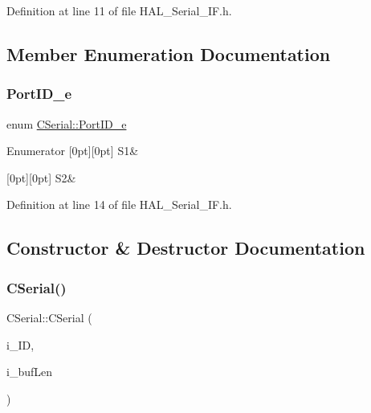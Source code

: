 Definition at line 11 of file H\+A\+L\+\_\+\+Serial\+\_\+\+I\+F.\+h.



\subsection{Member Enumeration Documentation}
\mbox{\label{class_c_serial_a000039540cc90b18bafacf5744e7eda2}} 
\subsubsection{\texorpdfstring{PortID\_e}{PortID\_e}}
{\footnotesize\ttfamily enum \mbox{\hyperlink{class_c_serial_a000039540cc90b18bafacf5744e7eda2}{C\+Serial\+::\+Port\+I\+D\+\_\+e}}}

\begin{DoxyEnumFields}{Enumerator}
[0pt][0pt]{}\mbox{\label{class_c_serial_a000039540cc90b18bafacf5744e7eda2a2a245d3c55e5b6e7052daf261924ce08}} 
S1&\\
\hline

[0pt][0pt]{}\mbox{\label{class_c_serial_a000039540cc90b18bafacf5744e7eda2a8cc95f4591147b0df028e003f82220a1}} 
S2&\\
\hline

\end{DoxyEnumFields}


Definition at line 14 of file H\+A\+L\+\_\+\+Serial\+\_\+\+I\+F.\+h.



\subsection{Constructor \& Destructor Documentation}
\mbox{\label{class_c_serial_a3b2b31de1529b884b8d5e354586ee981}} 
\subsubsection{\texorpdfstring{CSerial()}{CSerial()}}
{\footnotesize\ttfamily C\+Serial\+::\+C\+Serial (\begin{DoxyParamCaption}\item[{\mbox{\hyperlink{class_c_serial_a000039540cc90b18bafacf5744e7eda2}{Port\+I\+D\+\_\+e}}}]{i\+\_\+\+ID,  }\item[{\mbox{\hyperlink{_a_d_a_s___types_8h_a1f1825b69244eb3ad2c7165ddc99c956}{uint16\+\_\+t}}}]{i\+\_\+buf\+Len }\end{DoxyParamCaption})}



